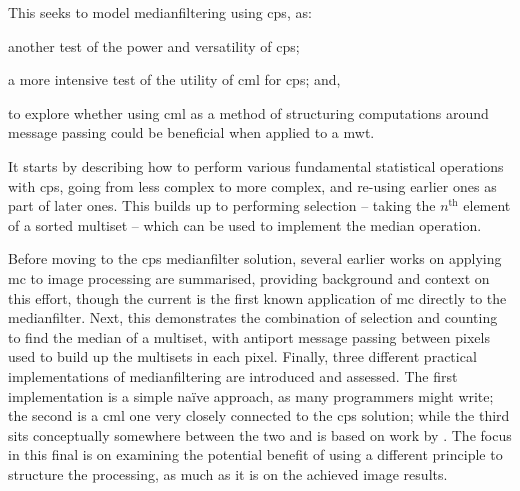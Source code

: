 This  seeks to model \gls{medianfilter}ing using \gls{cps}, as:
\begin{inparaenum}[a)]
\item  another test of the power and versatility of \gls{cps};
\item a more intensive test of the utility of \gls{cml} for \gls{cps}; and,
\item to explore whether using \gls{cml} as a method of structuring computations around message passing could be beneficial when applied to a \gls{mwt}.
\end{inparaenum}
It starts by describing how to perform various fundamental statistical operations with \gls{cps}, going from less complex to more complex, and re-using earlier ones as part of later ones.  This builds up to performing selection -- taking the \(n^{\text{th}}\) element of a sorted multiset -- which can be used to implement the median operation.

Before moving to the \gls{cps} \gls{medianfilter} solution, several earlier works on applying \gls{mc} to image processing are summarised, providing background and context on this effort, though the current  is the first known application of \gls{mc} directly to the \gls{medianfilter}.  Next, this  demonstrates the combination of selection and counting to find the median of a multiset, with antiport message passing between pixels used to build up the multisets in each pixel.  Finally, three different practical implementations of \gls{medianfilter}ing are introduced and assessed.  The first implementation is a simple naïve approach, as many programmers might write; the second is a \gls{cml} one very closely connected to the \gls{cps} solution; while the third sits conceptually somewhere between the two and is based on work by \citeauthor{Braunl2001} \cite{Braunl2001}.  The focus in this final  is on examining the potential benefit of using a different principle to structure the processing, as much as it is on the achieved image results.